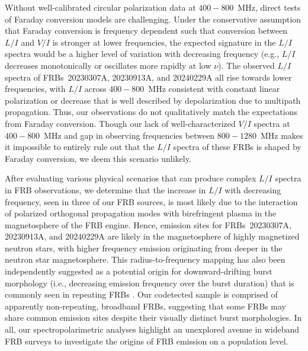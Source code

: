 \documentclass[twocolumn, linenumbers]{aastex701}
\begin{document}
Without well-calibrated circular polarization data at $400-800$~MHz, direct tests of Faraday conversion models are challenging. Under the conservative assumption that Faraday conversion is frequency dependent such that conversion between $L/I$ and $V/I$ is stronger at lower frequencies, the expected signature in the $L/I$ spectra would be a higher level of variation with decreasing frequency (e.g., $L/I$ decreases monotonically or oscillates more rapidly at low $\nu$). The observed $L/I$ spectra of FRBs~20230307A, 20230913A, and 20240229A all rise towards lower frequencies, with $L/I$ across $400-800$~MHz consistent with constant linear polarization or decrease that is well described by depolarization due to multipath propagation. Thus, our observations do not qualitatively match the expectations from Faraday conversion. Though our lack of well-characterized $V/I$ spectra at $400-800$~MHz and gap in observing frequencies between $800-1280$~MHz makes it impossible to entirely rule out that the $L/I$ spectra of these FRBs is shaped by Faraday conversion, we deem this scenario unlikely.

After evaluating various physical scenarios that can produce complex $L/I$ spectra in FRB observations, we determine that the increase in $L/I$ with decreasing frequency, seen in three of our FRB sources, is most likely due to the interaction of polarized orthogonal propagation modes with birefringent plasma in the magnetosphere of the FRB engine. Hence, emission sites for FRBs~20230307A, 20230913A, and 20240229A are likely in the magnetosphere of highly magnetized neutron stars, with higher frequency emission originating from deeper in the neutron star magnetosphere. This radius-to-frequency mapping has also been independently suggested as a potential origin for downward-drifting burst morphology (i.e., decreasing emission frequency over the burst duration) that is commonly seen in repeating FRBs \citep[e.g.,][]{2019ApJ...876L..23H, 2020ApJ...889..135L, 2022MNRAS.509.5679T}. Our codetected sample is comprised of apparently non-repeating, broadband FRBs, suggesting that some FRBs may share common emission sites despite their visually distinct burst morphologies. In all, our spectropolarimetric analyses highlight an unexplored avenue in wideband FRB surveys to investigate the origins of FRB emission on a population level.
\end{document}
